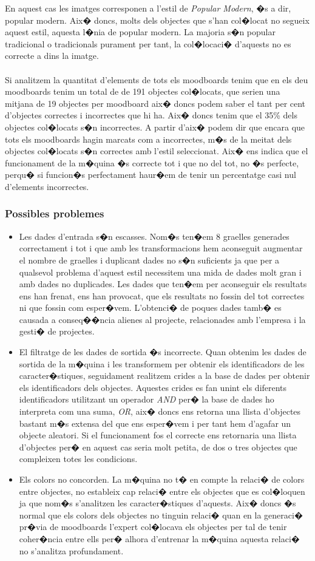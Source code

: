 \documentclass[12pt,a4paper,openright,oneside]{article}
\numberwithin{equation}{section}
\theoremstyle{definition}
\begin{document}
En aquest cas les imatges corresponen a l'estil de \textit{Popular Modern}, �s a dir, popular modern. Aix� doncs, molts dels objectes que s'han col�locat no segueix aquest estil, aquesta l�nia de popular modern. La majoria s�n popular tradicional o tradicionals purament per tant, la col�locaci� d'aquests no es correcte a dins la imatge. \\\\
Si analitzem la quantitat d'elements de tots els moodboards tenim que en els deu moodboards tenim un total de de 191 objectes col�locats, que serien una mitjana de 19 objectes per moodboard aix� doncs podem saber el tant per cent d'objectes correctes i incorrectes que hi ha. Aix� doncs tenim que el 35\% dels objectes col�locats s�n incorrectes. A partir d'aix� podem dir que encara que tots els moodboards hagin marcats com a incorrectes, m�s de la meitat dels objectes col�locats s�n correctes amb l'estil seleccionat. Aix� ens indica que el funcionament de la m�quina �s correcte tot i que no del tot, no �s perfecte, perqu� si funcion�s perfectament haur�em de tenir un percentatge casi nul d'elements incorrectes.
\subsubsection{Possibles problemes}
\begin{itemize}
\item Les dades d'entrada s�n escasses. Nom�s ten�em 8 graelles generades correctament i tot i que amb les transformacions hem aconseguit augmentar el nombre de graelles i duplicant dades no s�n suficients ja que per a qualsevol problema d'aquest estil necessitem una mida de dades molt gran i amb dades no duplicades. Les dades que ten�em per aconseguir els resultats ens han frenat, ens han provocat, que els resultats no fossin del tot correctes ni que fossin com esper�vem. L'obtenci� de poques dades tamb� es causada a conseq��ncia alienes al projecte, relacionades amb l'empresa i la gesti� de projectes.
\item El filtratge de les dades de sortida �s incorrecte. Quan obtenim les dades de sortida de la m�quina i les transformem per obtenir els identificadors de les caracter�stiques, seguidament realitzem crides a la base de dades per obtenir els identificadors dels objectes. Aquestes crides es fan unint els diferents identificadors utilitzant un operador \textit{AND} per� la base de dades ho interpreta com una suma, \textit{OR}, aix� doncs ens retorna una llista d'objectes bastant  m�s extensa del que ens esper�vem i per tant hem d'agafar un objecte aleatori. Si el funcionament fos el correcte ens retornaria una llista d'objectes per� en aquest cas seria molt petita, de dos o tres objectes que compleixen totes les condicions.
\item Els colors no concorden. La m�quina no t� en compte la relaci� de colors entre objectes, no estableix cap relaci� entre els objectes que es col�loquen ja que nom�s s'analitzen les caracter�stiques d'aquests. Aix� doncs �s normal que els colors dels objectes no tinguin relaci� quan en la generaci� pr�via de moodboards l'expert col�locava els objectes per tal de tenir coher�ncia entre ells per� alhora d'entrenar la m�quina aquesta relaci� no s'analitza profundament.
\end{itemize}
\newpage
\end{document}
